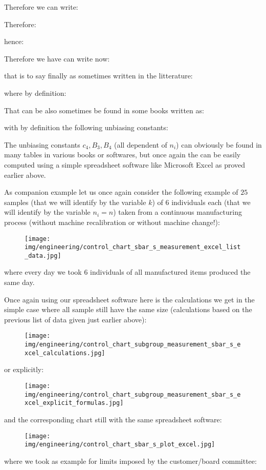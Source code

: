 	Therefore we can write:
	
	
	Therefore:
	
	hence:
	
	Therefore we have can write now:
	
	that is to say finally as sometimes written in the litterature:
	
	where by definition:
	
	That can be also sometimes be found in some books written as:
		
	with by definition the following unbiasing constants:
	
	The unbiasing constants $c_4,B_3,B_4$ (all dependent of $n_i$) can obviously be found in many tables in various books or softwares, but once again the can be easily computed using a simple spreadsheet software like Microsoft Excel as proved earlier above.

	As companion example let us once again consider the following example of $25$ samples (that we will identify by the variable $k$) of $6$ individuals each (that we will identify by the variable $n_i=n$) taken from a continuous manufacturing process (without machine recalibration or without machine change!):
 	\begin{figure}[H]
		\centering
		\texttt{[image: img/engineering/control\_chart\_sbar\_s\_measurement\_excel\_list\_data.jpg]}
	\end{figure}
	where every day we took $6$ individuals of all manufactured items produced the same day.
	
	Once again using our spreadsheet software here is the calculations we get in the simple case where all sample still have the same size (calculations based on the previous list of data given just earlier above):
	\begin{figure}[H]
		\centering
		\texttt{[image: img/engineering/control\_chart\_subgroup\_measurement\_sbar\_s\_excel\_calculations.jpg]}
	\end{figure}
	or explicitly:
	\begin{figure}[H]
		\centering
		\texttt{[image: img/engineering/control\_chart\_subgroup\_measurement\_sbar\_s\_excel\_explicit\_formulas.jpg]}
	\end{figure}
	and the corresponding chart still with the same spreadsheet software:
	\begin{figure}[H]
		\centering
		\texttt{[image: img/engineering/control\_chart\_sbar\_s\_plot\_excel.jpg]}
	\end{figure}
	where we took as example for limits imposed by the customer/board committee:
	
